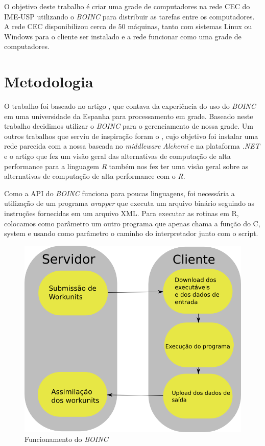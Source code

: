 \documentclass[b1]{sciposter}
\begin{document}
\begin{multicols}{2}
O objetivo deste trabalho é criar uma grade de computadores na rede CEC do IME-USP utilizando o \textit{BOINC} para distribuir as tarefas
entre os computadores. A rede CEC disponibilizou cerca de $50$ máquinas, tanto com sistemas Linux ou Windows para o cliente
ser instalado e a rede funcionar como uma grade de computadores.

\section{Metodologia}

O trabalho foi baseado no artigo \cite{boinc}, que contava da experiência do uso do \textit{BOINC} em uma universidade da Espanha para processamento em grade. Baseado neste trabalho decidimos utilizar o \textit{BOINC} para o gerenciamento de nossa grade. Um  outros trabalhos que serviu de inspiração foram o \cite{Dias}, cujo objetivo foi instalar uma rede parecida com a nossa baseada no \textit{middleware} \textit{Alchemi} e na plataforma \textit{.NET} e o artigo \cite{epub8991} que fez um visão geral das alternativas de computação de alta performance 
 para a linguagem \textit{R} também nos fez ter uma visão geral sobre as alternativas de computação de alta performance com o \textit{R}.

Como a API do \textit{BOINC} funciona para poucas linguagens, foi necessária a utilização de um programa 
\textit{wrapper} que executa um arquivo binário seguindo as instruções fornecidas em um arquivo XML. Para 
executar as rotinas em R, colocamos como parâmetro um outro programa que apenas chama a função do C, system e usando como parâmetro o caminho 
do interpretador junto com o script. 

\begin{figure}[!ht]
  \centering
  \includegraphics[scale=0.7]{boinc-schema.png}
  \caption{Funcionamento do \textit{BOINC}}
  \label{boinc_funcionamento}
\end{figure}



\end{multicols}
\end{document}
